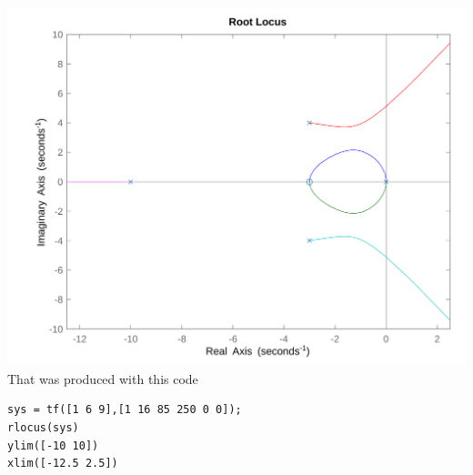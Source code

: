 \documentclass[12pt]{article}
\begin{document}
\includegraphics[scale=.2]{Problem2Matlab1.png}
\\That was produced with this code
\begin{verbatim}
sys = tf([1 6 9],[1 16 85 250 0 0]);
rlocus(sys)
ylim([-10 10])
xlim([-12.5 2.5])
\end{verbatim}
\end{document}
